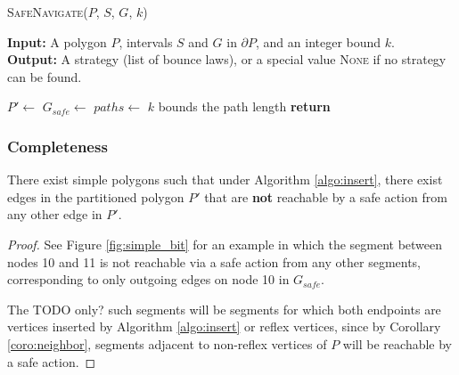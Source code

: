 \documentclass[]{styles/svproc}  %
\begin{document}
\begin{algorithm}
\caption{\textsc{SafeNavigate}($P$, $S$, $G$, $k$)}
\label{algo:nav}
\hspace*{\algorithmicindent} \textbf{Input:} A polygon $P$, intervals $S$ and
$G$ in $\partial P$, and an integer bound $k$.\\
\hspace*{\algorithmicindent} \textbf{Output:} A strategy (list of bounce laws),
or a special value \textsc{None} if no strategy can be found.
\begin{algorithmic}[1]
\State $P' \gets$ 
\State $G_{safe} \gets$ 
\State $paths \gets$ 
\Comment $k$ bounds the path length
\State \textbf{return} 
\end{algorithmic}
\end{algorithm}

\subsubsection{Completeness}


\begin{proposition}
There exist simple polygons such that under Algorithm \ref{algo:insert}, there
exist edges in the partitioned polygon $P'$ that are \textbf{not} reachable by 
a safe action from any other edge in $P'$.
\end{proposition}

\begin{proof}
See Figure \ref{fig:simple_bit} for an example in which the segment between nodes
10 and 11 is not reachable via a safe action from any other segments,
corresponding to only outgoing edges on node 10 in $G_{safe}$.

The {\color{red} TODO only?} such segments will be
segments for which both endpoints are vertices inserted by Algorithm
\ref{algo:insert} or reflex vertices, since by Corollary \ref{coro:neighbor},
segments adjacent to non-reflex vertices of $P$ will be reachable by a safe
action.
\end{proof}
\end{document}
